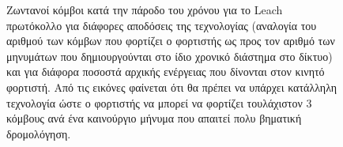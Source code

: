 \begin{figure}[H]
  \caption{Ζωντανοί κόμβοι κατά την πάροδο του χρόνου για το Leach πρωτόκολλο για διάφορες αποδόσεις της τεχνολογίας (αναλογία του αριθμού των κόμβων που φορτίζει
ο φορτιστής ως προς τον αριθμό των μηνυμάτων που δημιουργούνται στο ίδιο χρονικό διάστημα στο δίκτυο) και για διάφορα ποσοστά αρχικής ενέργειας που δίνονται στον
κινητό φορτιστή. Από τις εικόνες φαίνεται ότι θα πρέπει να υπάρχει κατάλληλη τεχνολογία ώστε ο φορτιστής να μπορεί να φορτίζει τουλάχιστον 3 κόμβους ανά ένα
καινούργιο μήνυμα που απαιτεί πολυ βηματική δρομολόγηση.}
  \label{fig:1exp_3_1}
\end{figure}


